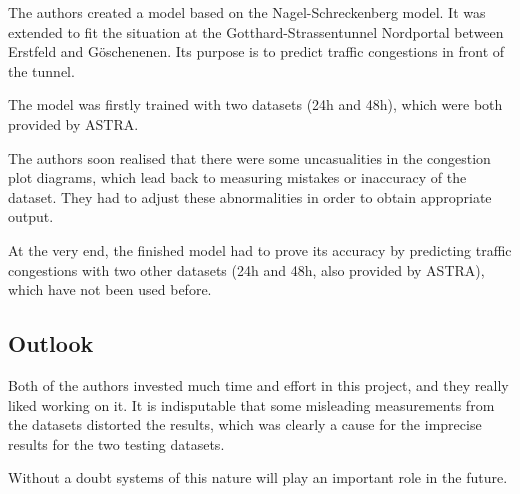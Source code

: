 The authors created a model based on the Nagel-Schreckenberg model. It was extended to fit the situation at the
Gotthard-Strassentunnel Nordportal between Erstfeld and Göschenenen. Its purpose is to predict traffic congestions in
front of the tunnel.

The model was firstly trained with two datasets (24h and 48h), which were both provided by ASTRA.

The authors soon realised that there were some uncasualities in the congestion plot diagrams, which lead back to
measuring mistakes or inaccuracy of the dataset. They had to adjust these abnormalities in order to obtain appropriate output.

At the very end, the finished model had to prove its accuracy by predicting traffic congestions with two other datasets
(24h and 48h, also provided by ASTRA), which have not been used before.


\subsection{Outlook}
Both of the authors invested much time and effort in this project, and they really liked working on it. It is indisputable
that some misleading measurements from the datasets distorted the results, which was clearly a cause for the imprecise
results for the two testing datasets.

Without a doubt systems of this nature will play an important role in the future.
